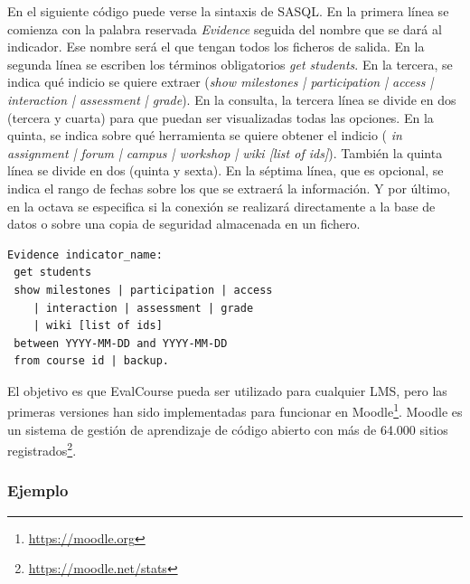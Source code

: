 			En el siguiente código puede verse la sintaxis de SASQL. En la primera línea se comienza con la palabra reservada \emph{Evidence} seguida del nombre que se dará al indicador. Ese nombre será el que tengan todos los ficheros de salida. En la segunda línea se escriben los términos obligatorios \emph{get students}. En la tercera, se indica qué indicio se quiere extraer (\emph{show milestones | participation | access | interaction | assessment | grade}). En la consulta, la tercera línea se divide en dos (tercera y cuarta) para que puedan ser visualizadas todas las opciones. En la quinta, se indica sobre qué herramienta se quiere obtener el indicio (\emph{ in assignment | forum | campus | workshop | wiki [list of ids]}). También la quinta línea se divide en dos (quinta y sexta). En la séptima línea, que es opcional, se indica el rango de fechas sobre los que se extraerá la información. Y por último, en la octava se especifica si la conexión se realizará directamente a la base de datos o sobre una copia de seguridad almacenada en un fichero.



\begin{verbatim}
Evidence indicator_name:
 get students 
 show milestones | participation | access 
	| interaction | assessment | grade
	| wiki [list of ids]
 between YYYY-MM-DD and YYYY-MM-DD
 from course id | backup.
\end{verbatim}

			El objetivo es que EvalCourse pueda ser utilizado para cualquier LMS, pero las primeras versiones han sido implementadas para funcionar en Moodle\footnote{\url{https://moodle.org}}. Moodle es un sistema de gestión de aprendizaje de código abierto con más de 64.000 sitios registrados\footnote{\url{https://moodle.net/stats}}.


			\subsubsection*{Ejemplo}

